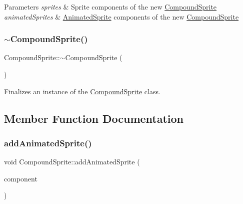 \begin{DoxyParams}{Parameters}
{\em sprites} & Sprite components of the new \hyperlink{class_compound_sprite}{Compound\+Sprite}\\
\hline
{\em animated\+Sprites} & \hyperlink{class_animated_sprite}{Animated\+Sprite} components of the new \hyperlink{class_compound_sprite}{Compound\+Sprite}\\
\hline
\end{DoxyParams}
\mbox{\label{class_compound_sprite_aca999fc5b5e8acad37303ae151ab9bd9}} 
\subsubsection{\texorpdfstring{$\sim$\+Compound\+Sprite()}{~CompoundSprite()}}
{\footnotesize\ttfamily Compound\+Sprite\+::$\sim$\+Compound\+Sprite (\begin{DoxyParamCaption}{ }\end{DoxyParamCaption})\hspace{0.3cm}{\ttfamily [virtual]}}



Finalizes an instance of the \hyperlink{class_compound_sprite}{Compound\+Sprite} class. 



\subsection{Member Function Documentation}
\mbox{\label{class_compound_sprite_af7e1ddd3e7b682ff2d386cc71a211019}} 
\subsubsection{\texorpdfstring{add\+Animated\+Sprite()}{addAnimatedSprite()}}
{\footnotesize\ttfamily void Compound\+Sprite\+::add\+Animated\+Sprite (\begin{DoxyParamCaption}\item[{\hyperlink{class_animated_sprite}{Animated\+Sprite} $\ast$}]{component }\end{DoxyParamCaption})}



